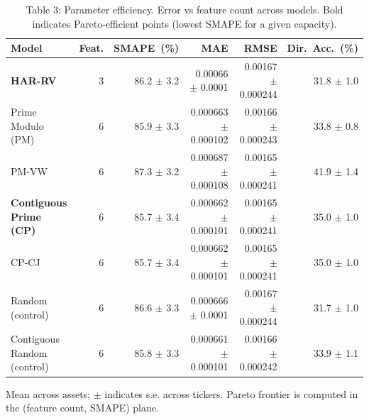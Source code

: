 \begin{table}[t]
\centering
\caption{Table 3: Parameter efficiency. Error vs feature count across models. Bold indicates Pareto-efficient points (lowest SMAPE for a given capacity).}
\label{tab:param_efficiency}
\begin{tabular}{l r r r r r}
\toprule
Model & Feat. & SMAPE~(\%) & MAE & RMSE & Dir.~Acc.~(\%) \\
\midrule
\textbf{HAR-RV} & 3 & 86.2 $\pm$ 3.2 & 0.00066 $\pm$ 0.0001 & 0.00167 $\pm$ 0.000244 & 31.8 $\pm$ 1.0 \\
Prime Modulo (PM) & 6 & 85.9 $\pm$ 3.3 & 0.000663 $\pm$ 0.000102 & 0.00166 $\pm$ 0.000243 & 33.8 $\pm$ 0.8 \\
PM-VW & 6 & 87.3 $\pm$ 3.2 & 0.000687 $\pm$ 0.000108 & 0.00165 $\pm$ 0.000241 & 41.9 $\pm$ 1.4 \\
\textbf{Contiguous Prime (CP)} & 6 & 85.7 $\pm$ 3.4 & 0.000662 $\pm$ 0.000101 & 0.00165 $\pm$ 0.000241 & 35.0 $\pm$ 1.0 \\
CP-CJ & 6 & 85.7 $\pm$ 3.4 & 0.000662 $\pm$ 0.000101 & 0.00165 $\pm$ 0.000241 & 35.0 $\pm$ 1.0 \\
Random (control) & 6 & 86.6 $\pm$ 3.3 & 0.000666 $\pm$ 0.0001 & 0.00167 $\pm$ 0.000244 & 31.7 $\pm$ 1.0 \\
Contiguous Random (control) & 6 & 85.8 $\pm$ 3.3 & 0.000661 $\pm$ 0.000101 & 0.00166 $\pm$ 0.000242 & 33.9 $\pm$ 1.1 \\
\bottomrule
\end{tabular}
\vspace{2pt}
\footnotesize{Mean across assets; $\pm$ indicates s.e. across tickers. Pareto frontier is computed in the (feature count, SMAPE) plane.}
\end{table}